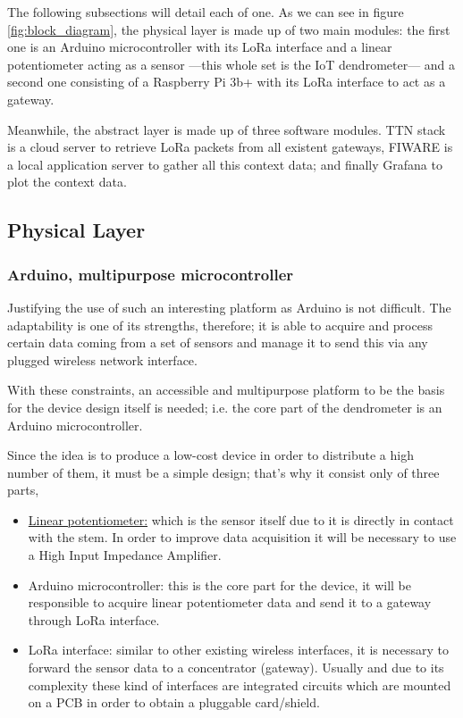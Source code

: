 \documentclass[11pt,a4paper,dvipsnames,twoside]{article}
\begin{document}
The following subsections will detail each of one. As we can see in figure \ref{fig:block_diagram}, the physical layer is made up of two main modules: the first one is an Arduino microcontroller with its LoRa interface and a linear potentiometer acting as a sensor ---this whole set is the IoT dendrometer--- and a second one consisting of a Raspberry Pi 3b+ with its LoRa interface to act as a gateway.

Meanwhile, the abstract layer is made up of three software modules. TTN stack is a cloud server to retrieve LoRa packets from all existent gateways, FIWARE is a local application server to gather all this context data; and finally Grafana to plot the context data.
\subsection{Physical Layer}

\subsubsection{Arduino, multipurpose microcontroller}
Justifying the use of such an interesting platform as Arduino is not difficult. The adaptability is one of its strengths, therefore; it is able to acquire and process certain data coming from a set of sensors and manage it to send this via any plugged wireless network interface.

With these constraints, an accessible and multipurpose platform to be the basis for the device design itself is needed; i.e. the core part of the dendrometer is an Arduino microcontroller.

Since the idea is to produce a low-cost device in order to distribute a high number of them, it must be a simple design; that's why it consist only of three parts,

\begin{itemize}
  \item \href{https://es.rs-online.com/web/p/products/0317780/}{Linear potentiometer:} which is the sensor itself due to it is directly in contact with the stem. In order to improve data acquisition it will be necessary to use a High Input Impedance Amplifier.
  \item Arduino microcontroller: this is the core part for the device, it will be responsible to acquire linear potentiometer data and send it to a gateway through LoRa interface. 
  \item LoRa interface: similar to other existing wireless interfaces, it is necessary to forward the sensor data to a concentrator (gateway). Usually and due to its complexity these kind of interfaces are integrated circuits which are mounted on a PCB in order to obtain a pluggable card/shield. 
\end{itemize}
\end{document}
